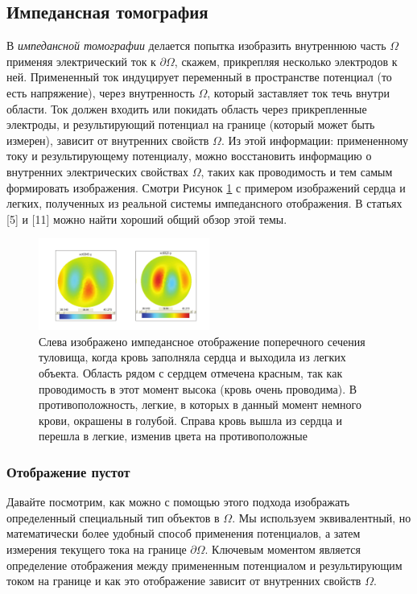 \documentclass[a4paper, 12pt]{article}
\begin{document}
\subsection{Импедансная томография}


В \textit{импедансной томографии} делается попытка изобразить внутреннюю часть $\Omega$ применяя электрический ток к $\partial \Omega$, скажем, прикрепляя несколько электродов к ней. Примененный ток индуцирует переменный в пространстве потенциал (то есть напряжение), через внутренность $\Omega$, который заставляет ток течь внутри области. Ток должен входить или покидать область через прикрепленные электроды, и результирующий потенциал на границе (который может быть измерен), зависит от внутренних свойств $\Omega$. Из этой информации: примененному току и результирующему потенциалу, можно восстановить информацию о внутренних электрических свойствах $\Omega$, таких как проводимость и тем самым формировать изображения. Смотри Рисунок \ref{fig:2} с примером изображений сердца и легких, полученных из реальной системы импедансного отображения. В статьях [5] и [11] можно найти хороший общий обзор этой темы.
\begin{figure}[t]
  \centering
  \includegraphics[width=0.5\textwidth]{2.png}
  \caption{Слева изображено импедансное отображение поперечного сечения туловища, когда кровь заполняла сердца и выходила из легких объекта.
  Область рядом с сердцем отмечена красным, так как проводимость в этот момент высока (кровь очень проводима). В противоположность, легкие, в которых в данный момент немного крови, окрашены в голубой. Справа кровь вышла из сердца и перешла в легкие, изменив цвета на противоположные}
  \label{fig:2}
\end{figure}

\subsubsection{Отображение пустот}


Давайте посмотрим, как можно с помощью этого подхода изображать определенный специальный тип объектов в $\Omega$. Мы используем эквивалентный, но математически более удобный способ применения потенциалов, а затем измерения текущего тока на границе $\partial \Omega$. Ключевым моментом является определение отображения между примененным потенциалом и результирующим током на границе и как это отображение зависит от внутренних свойств $\Omega$.
\end{document}
